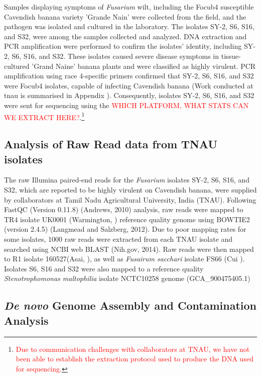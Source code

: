 Samples displaying symptoms of \textit{Fusarium} wilt, including the \ac{Focub4} susceptible Cavendish banana variety 'Grande Nain' were collected from the field, and the pathogen was isolated and cultured in the laboratory. The isolates SY-2, S6, S16, and S32, were among the samples collected and analyzed. DNA extraction and PCR amplification were performed to confirm the isolates' identity, including SY-2, S6, S16, and S32. These isolates caused severe disease symptoms in tissue-cultured 'Grand Naine' banana plants and were classified as highly virulent. PCR amplification using race 4-specific primers confirmed that SY-2, S6, S16, and S32 were \ac{Focub4} isolates, capable of infecting Cavendish banana (Work conducted at \ac{tnau} is summarised in Appendix ). Consequently, isolates SY-2, S6, S16, and S32 were sent for sequencing using the \textcolor{red}{WHICH PLATFORM, WHAT STATS CAN WE EXTRACT HERE?}.\footnote{\textcolor{red}{Due to communication challenges with collaborators at TNAU, we have not been able to establish the extraction protocol used to produce the DNA used for sequencing.}}

\subsection{Analysis of Raw Read data from TNAU isolates}

The raw Illumina paired-end reads for the \textit{Fusarium} isolates SY-2, S6, S16, and S32, which are reported to be highly virulent on Cavendish banana, were supplied by collaborators at Tamil Nadu Agricultural University, India (TNAU). Following FastQC (Version 0.11.8) (Andrews, 2010) analysis, raw reads were mapped to \Focub TR4 isolate UK0001 (Warmington, ) reference quality genome using BOWTIE2 (version 2.4.5) (Langmead and Salzberg, 2012). Due to poor mapping rates for some isolates, 1000 raw reads were extracted from each TNAU isolate and searched using NCBI web BLAST (Nih.gov, 2014). 
Raw reads were then mapped to \Focub R1 isolate 160527(Asai, ), as well as \textit{Fusairum sacchari} isolate FS66 (Cui ). Isolates S6, S16 and S32 were also mapped to a reference quality \textit{Stenotrophomonas maltophilia} isolate NCTC10258 genome (GCA\_900475405.1) 

\subsection{\textit{De novo} Genome Assembly and Contamination Analysis}

